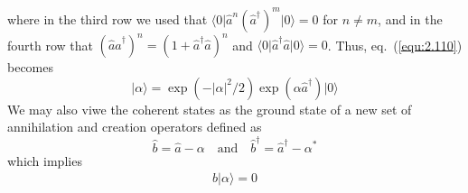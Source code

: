 where in the third row we used that
$\langle 0\vert \hat{a}^n(\hat{a}^{\dagger})^m\vert 0\rangle  = 0$ for $n \neq m$, and
in the fourth row that $(\hat{a}\hat{a}^{\dagger})^n = (1+
\hat{a}^{\dagger}\hat{a})^n$ and
$\langle 0\vert \hat{a}^{\dagger}\hat{a}\vert 0\rangle  = 0$. Thus,
eq.~(\ref{equ:2.110})  becomes
\begin{equation}
  \vert \alpha\rangle  = \exp(-\vert \alpha\vert ^2/2)
  \exp(\alpha\hat{a}^{\dagger})\vert 0\rangle 
  \label{equ:2.112}
\end{equation}
We may also viwe the coherent states as the ground state of
a new set of annihilation and creation operators defined as
\begin{equation}
  \hat{b} = \hat{a} - \alpha \quad \text{and}\quad
  \hat{b}^{\dagger} = \hat{a}^{\dagger} - \alpha^*
  \label{equ:2.113}
\end{equation}
which implies
\begin{equation}
  \hat{b}\vert \alpha\rangle  = 0
  \label{equ:2.114}
\end{equation}

